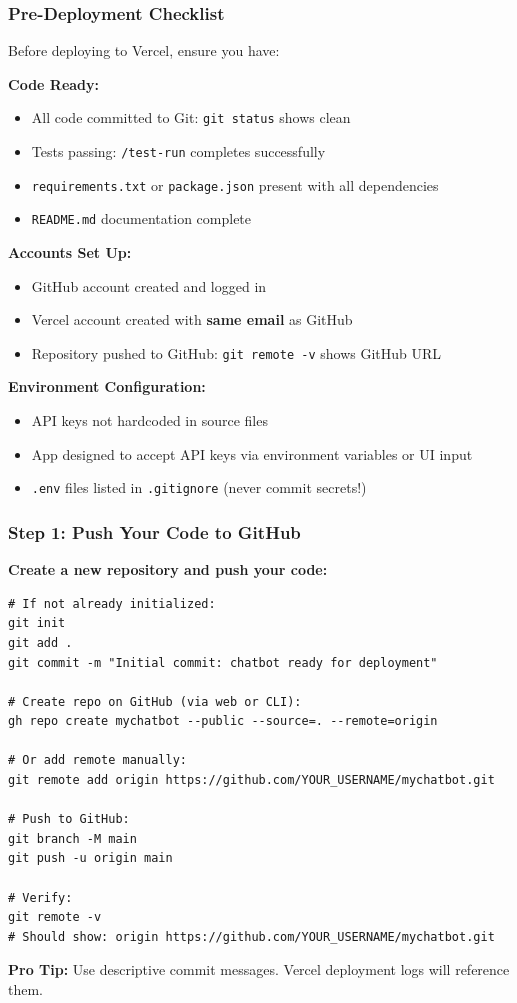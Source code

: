\begin{frame}[fragile]\frametitle{Pre-Deployment Checklist}
Before deploying to Vercel, ensure you have:

\textbf{Code Ready:}
  \begin{itemize}
    \item All code committed to Git: \lstinline|git status| shows clean
    \item Tests passing: \lstinline|/test-run| completes successfully
    \item \texttt{requirements.txt} or \texttt{package.json} present with all dependencies
    \item \texttt{README.md} documentation complete
  \end{itemize}

\textbf{Accounts Set Up:}
  \begin{itemize}
    \item GitHub account created and logged in
    \item Vercel account created with \textbf{same email} as GitHub
    \item Repository pushed to GitHub: \lstinline|git remote -v| shows GitHub URL
  \end{itemize}

\textbf{Environment Configuration:}
  \begin{itemize}
    \item API keys not hardcoded in source files
    \item App designed to accept API keys via environment variables or UI input
    \item \texttt{.env} files listed in \texttt{.gitignore} (never commit secrets!)
  \end{itemize}
\end{frame}


\begin{frame}[fragile]\frametitle{Step 1: Push Your Code to GitHub}
\textbf{Create a new repository and push your code:}

\begin{lstlisting}
# If not already initialized:
git init
git add .
git commit -m "Initial commit: chatbot ready for deployment"

# Create repo on GitHub (via web or CLI):
gh repo create mychatbot --public --source=. --remote=origin

# Or add remote manually:
git remote add origin https://github.com/YOUR_USERNAME/mychatbot.git

# Push to GitHub:
git branch -M main
git push -u origin main

# Verify:
git remote -v
# Should show: origin https://github.com/YOUR_USERNAME/mychatbot.git
\end{lstlisting}

\textbf{Pro Tip:} Use descriptive commit messages. Vercel deployment logs will reference them.
\end{frame}


